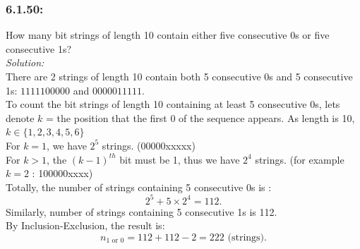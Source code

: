 \documentclass[a4paper]{article}
\begin{document}
\subsubsection*{6.1.50:} How many bit strings of length 10 contain either five consecutive 0s or five consecutive 1s?\\
\textit{Solution:} \\
There are 2 strings of length 10 contain both 5 consecutive 0s and 5 consecutive 1s: $1111100000$ and $0000011111$.\\
To count the bit strings of length 10 containing at least 5 consecutive 0s, lets denote $k$ = the position that the first 0 of the sequence appears. As length is 10, $k \in \{1,2,3,4,5,6\}$ \\
For $k = 1$, we have $2^{5}$ strings. (00000xxxxx) \\
For $k > 1$, the $(k-1)^{th}$ bit must be 1, thus we have $2^{4}$ strings. (for example $k=2$ : 100000xxxx) \\
Totally, the number of strings containing 5 consecutive 0s is : 
\begin{equation*}
	2^{5} + 5\times 2^{4} = 112.
\end{equation*}
Similarly, number of strings containing 5 consecutive 1s is 112.\\
By Inclusion-Exclusion, the result is:
\begin{equation*}
	n_{1 \text{ or } 0} = 112 + 112 - 2 = 222 \text{ (strings).}
\end{equation*}
\end{document}
